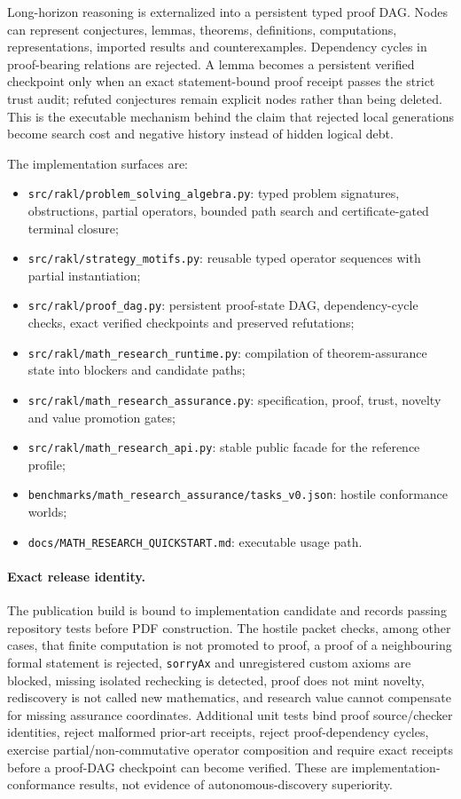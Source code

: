 Long-horizon reasoning is externalized into a persistent typed proof DAG. Nodes can represent conjectures, lemmas, theorems, definitions, computations, representations, imported results and counterexamples. Dependency cycles in proof-bearing relations are rejected. A lemma becomes a persistent verified checkpoint only when an exact statement-bound proof receipt passes the strict trust audit; refuted conjectures remain explicit nodes rather than being deleted. This is the executable mechanism behind the claim that rejected local generations become search cost and negative history instead of hidden logical debt.

The implementation surfaces are:
\begin{itemize}[leftmargin=*]
\item \texttt{src/rakl/problem\_solving\_algebra.py}: typed problem signatures, obstructions, partial operators, bounded path search and certificate-gated terminal closure;
\item \texttt{src/rakl/strategy\_motifs.py}: reusable typed operator sequences with partial instantiation;
\item \texttt{src/rakl/proof\_dag.py}: persistent proof-state DAG, dependency-cycle checks, exact verified checkpoints and preserved refutations;
\item \texttt{src/rakl/math\_research\_runtime.py}: compilation of theorem-assurance state into blockers and candidate paths;
\item \texttt{src/rakl/math\_research\_assurance.py}: specification, proof, trust, novelty and value promotion gates;
\item \texttt{src/rakl/math\_research\_api.py}: stable public facade for the reference profile;
\item \texttt{benchmarks/math\_research\_assurance/tasks\_v0.json}: hostile conformance worlds;
\item \texttt{docs/MATH\_RESEARCH\_QUICKSTART.md}: executable usage path.
\end{itemize}

\paragraph{Exact release identity.}
The publication build is bound to implementation candidate \ImplementationSHA{} and records \SoftwareTests{} passing repository tests before PDF construction. The hostile packet checks, among other cases, that finite computation is not promoted to proof, a proof of a neighbouring formal statement is rejected, \texttt{sorryAx} and unregistered custom axioms are blocked, missing isolated rechecking is detected, proof does not mint novelty, rediscovery is not called new mathematics, and research value cannot compensate for missing assurance coordinates. Additional unit tests bind proof source/checker identities, reject malformed prior-art receipts, reject proof-dependency cycles, exercise partial/non-commutative operator composition and require exact receipts before a proof-DAG checkpoint can become verified. These are implementation-conformance results, not evidence of autonomous-discovery superiority.

